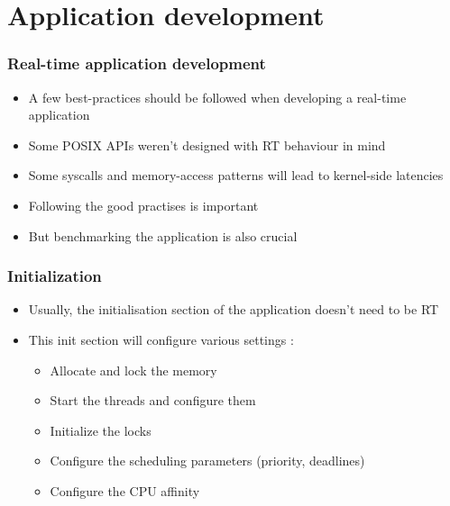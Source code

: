 \section{Application development}

\begin{frame}
\frametitle{Real-time application development}
	\begin{itemize}
		\item A few best-practices should be followed when developing a real-time application
		\item Some POSIX APIs weren't designed with RT behaviour in mind
		\item Some syscalls and memory-access patterns will lead to kernel-side latencies
		\item Following the good practises is important
		\item But benchmarking the application is also crucial
	\end{itemize}
\end{frame}

\begin{frame}
	\frametitle{Initialization}
	\begin{itemize}
		\item Usually, the initialisation section of the application doesn't need to be RT
		\item This init section will configure various settings :
			\begin{itemize}
				\item Allocate and lock the memory
				\item Start the threads and configure them
				\item Initialize the locks
				\item Configure the scheduling parameters (priority, deadlines)
				\item Configure the CPU affinity
			\end{itemize}

	\end{itemize}
\end{frame}

